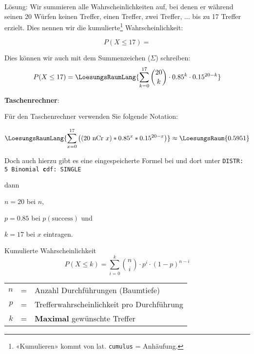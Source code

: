 Lösung: Wir summieren alle Wahrscheinlichkeiten auf, bei denen er
während seinen 20 Würfen
keinen Treffer, einen Treffer, zwei Treffer, ... bis zu 17 Treffer
erzielt. Dies nennen wir die kumulierte\footnote{«Kumulieren» kommt von
  lat. \texttt{cumulus} = Anhäufung.} Wahrscheinlichkeit:

$$P(X\le 17) = $$

Dies können wir auch mit dem Summenzeichen ($\Sigma$) schreiben:
$$P(X\le 17) = \LoesungsRaumLang{\sum_{k=0}^{17} {20 \choose k} \cdot 0.85^k \cdot 0.15^{20-k}}$$

\newpage
\textbf{Taschenrechner}:

\leserluft

Für den Taschenrechner verwenden Sie folgende Notation: 

$$\LoesungsRaumLang{\sum_{x=0}^{17}\left(( 20 \text{\,\,nCr\,\,} x ) * 0.85^x *
0.15^{20-x}\right)} \approx \LoesungsRaum{0.5951}$$


Doch auch hierzu gibt es eine eingespeicherte Formel
bei
 und dort unter \texttt{DISTR: 5
  Binomial\textbf{\color{red} c}df: SINGLE}

dann

$n=20$ bei $n$,

$p=0.85$ bei $p(\text{success})$ und

$k=17$ bei $x$ eintragen.



\begin{gesetz}{Kumulierte Wahrscheinlichkeit}{}
  $$P(X \le k) = \sum_{i=0}^k {n \choose i} \cdot{} p^i \cdot{} (1-p)^{n-i}$$


\begin{tabular}{rcl}
  $n$ &=& Anzahl Durchführungen (Baumtiefe)\\
  $p$ &=& Trefferwahrscheinlichkeit pro Durchführung\\
  $k$ &=& \textbf{Maximal} gewünschte Treffer\\
\end{tabular}

\end{gesetz}
\newpage

